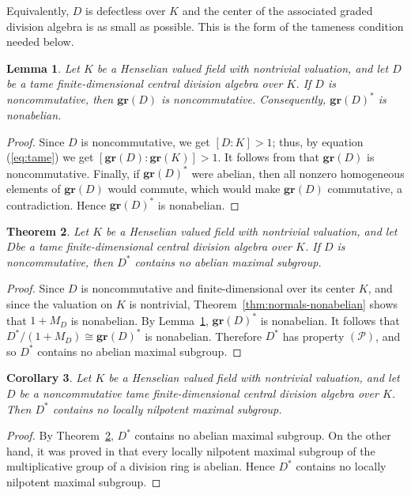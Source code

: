 \documentclass[11pt]{amsart}
\newtheorem{theorem}{Theorem}[section]
\newtheorem{corollary}[theorem]{Corollary}
\newtheorem{lemma}[theorem]{Lemma}
\theoremstyle{definition}
\begin{document}
Equivalently, $D$ is defectless over $K$ and the center of the associated
graded division algebra is as small as possible. This is the form of the
tameness condition needed below.

\begin{lemma}
\label{lem:tame-graded-noncommutative}
Let $K$ be a Henselian valued field with nontrivial valuation, and let $D$ be a tame finite-dimensional central division algebra over $K$. If $D$ is
noncommutative, then $\mathbf{gr}(D)$ is noncommutative. Consequently,
$\mathbf{gr}(D)^*$ is nonabelian.
\end{lemma}

\begin{proof}
Since $D$ is noncommutative, we get $[D:K]>1$; thus, by equation (\ref{eq:tame}) we get $[\mathbf{gr}(D):\mathbf{gr}(K)]>1$. It follows from that $\mathbf{gr}(D)$ is noncommutative. Finally, if $\mathbf{gr}(D)^*$ were abelian, then all nonzero homogeneous
elements of $\mathbf{gr}(D)$ would commute, which would make $\mathbf{gr}(D)$
commutative, a contradiction. Hence $\mathbf{gr}(D)^*$ is nonabelian.
\end{proof}


\begin{theorem}\label{thm:main-tame}
Let $K$ be a Henselian valued field with nontrivial valuation, and let $D$be a tame finite-dimensional central division algebra over $K$. If $D$ is noncommutative, then $D^*$ contains no abelian maximal subgroup.
\end{theorem}
\begin{proof}
Since $D$ is noncommutative and finite-dimensional over its center $K$, and since the valuation on $K$ is nontrivial, Theorem~\ref{thm:normals-nonabelian} shows that $1+M_D$ is nonabelian. By Lemma~\ref{lem:tame-graded-noncommutative}, $\mathbf{gr}(D)^*$ is nonabelian. It follows that $D^*/(1+M_D)\cong\mathbf{gr}(D)^*$ is nonabelian. Therefore $D^*$ has property $(\mathcal P)$, and so $D^*$ contains no abelian maximal subgroup.
\end{proof}

\begin{corollary}
\label{cor:no-locally-nilpotent-maximal}
Let $K$ be a Henselian valued field with nontrivial valuation, and let $D$ be a noncommutative tame finite-dimensional central division algebra over $K$. Then $D^*$ contains no locally nilpotent maximal subgroup.
\end{corollary}

\begin{proof}
By Theorem~\ref{thm:main-tame}, $D^*$ contains no abelian maximal subgroup.
On the other hand, it was proved in \cite{KH2} that every locally nilpotent maximal subgroup of the multiplicative group of a division ring is abelian. Hence $D^*$ contains no locally nilpotent maximal subgroup.
\end{proof}
\end{document}
